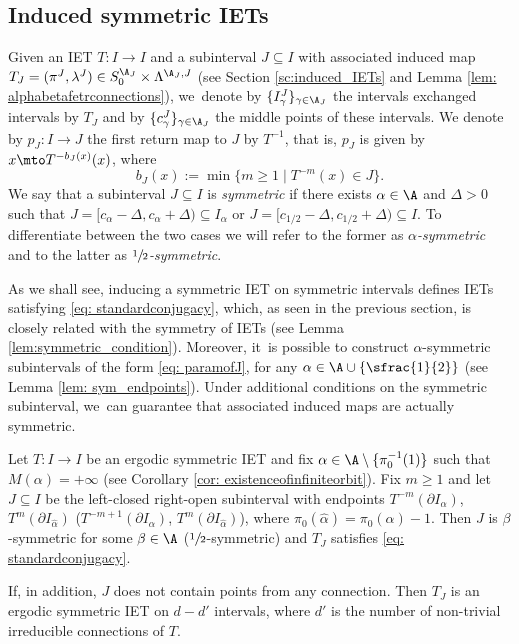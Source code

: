 \subsection{Induced symmetric IETs}
Given an IET $T: I \to I$ and a subinterval $J \subseteq I$ with associated induced map $T_J = (\pi^J, \lambda^J) \in S_0^{\A_J} \times \Lambda^{\A_J, J}$ (see Section \ref{sc:induced_IETs} and Lemma \ref{lem: alphabetafetrconnections}), we~denote by $\{I^J_\gamma\}_{\gamma \in \A_J}$ the intervals exchanged intervals by $T_J$ and by $\{c^J_\gamma\}_{\gamma \in \A_J}$ the middle points of these intervals. We denote by $p_J : I \to J$ the first return map to $J$ by $T^{-1}$, that is, $p_J$ is given by $x \mto T^{-b_J(x)}(x)$, where
\begin{equation}
\label{eq:backward_return}
b_J(x) := \min\{m \geq 1 \mid T^{-m}(x) \in J\}.
\end{equation}
We say that a subinterval $J \subseteq I$ is \emph{symmetric} if there exists $\alpha \in \A$ and $\Delta > 0$ such that $J = [c_\alpha - \Delta, c_\alpha + \Delta) \subseteq I_\alpha$ or $J=\big[c_{1/2}-\Delta, c_{1/2} +\Delta\big)\subseteq I$. To differentiate between the two cases we will refer to the former as \emph{$\alpha$-symmetric} and to the latter as \emph{$\sfrac{1}{2}$-symmetric}.

As we shall see, inducing a symmetric IET on symmetric intervals defines IETs satisfying \eqref{eq: standardconjugacy}, which, as seen in the previous section, is closely related with the symmetry of IETs (see Lemma \ref{lem:symmetric_condition}). Moreover, it~is possible to construct $\alpha$-symmetric subintervals of the form \eqref{eq: paramofJ}, for any $\alpha \in \A \cup \{\sfrac{1}{2}\}$ (see Lemma \ref{lem: sym_endpoints}). Under additional conditions on the symmetric subinterval, we~can guarantee that associated induced maps are actually symmetric.

\begin{proposition}
\label{prop:induced_symmetric}
Let $T: I \to I$ be an ergodic symmetric IET and fix $\alpha \in \A \setminus \{\pi_0^{-1}(1)\}$ such that $M(\alpha) = +\infty$ (see Corollary \ref{cor: existenceofinfiniteorbit}). Fix $m \geq 1$ and let $J \subseteq I$ be the left-closed right-open subinterval with endpoints $T^{-m}(\partial I_\alpha)$, $T^{m}(\partial I_{\hat \alpha})$ (\resp $T^{-m + 1}(\partial I_\alpha)$, $T^{m}(\partial I_{\hat \alpha})$), where $\pi_0(\hat \alpha) = \pi_0(\alpha) - 1$.
Then $J$ is $\beta$-symmetric for some $\beta \in \A$ (\resp $\sfrac{1}{2}$-symmetric) and $T_J$ satisfies \eqref{eq: standardconjugacy}.

If, in addition, $J$ does not contain points from any connection. Then $T_J$ is an ergodic symmetric IET on $d - d'$ intervals, where $d'$ is the number of non-trivial {irreducible} connections of $T$.
\end{proposition}

